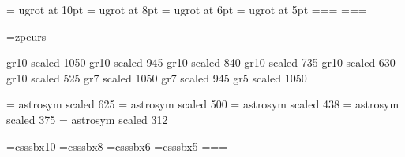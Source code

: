 \ifnum{}

  \font\tenve   = \fontdir ugrot at 10pt
  \font\eightve = \fontdir ugrot at 8pt
  \font\sixve   = \fontdir ugrot at 6pt
  \font\fiveve  = \fontdir ugrot at 5pt
  \textfont\vefam=\tenve \scriptfont\vefam=\eightve \scriptscriptfont\vefam=\sixve
  \textfont\vefam=\tenve \scriptfont\vefam=\eightve \scriptscriptfont\vefam=\sixve

  \font\eurofnt=\fontdir zpeurs

  \font\tengr    \fontdir gr10 scaled 1050
  \font\ninegr   \fontdir gr10 scaled 945
  \font\eightgr  \fontdir gr10 scaled 840
  \font\sevengr  \fontdir gr10 scaled 735
  \font\sixgr    \fontdir gr10 scaled 630
  \font\fivegr   \fontdir gr10 scaled 525
  \font\sevengr  \fontdir gr7  scaled 1050
  \font\sixgr    \fontdir gr7  scaled 945
  \font\fivegr   \fontdir gr5  scaled 1050

  \font\astrosymten   = \fontdir astrosym scaled 625
  \font\astrosymeight = \fontdir astrosym scaled 500
  \font\astrosymseven = \fontdir astrosym scaled 438
  \font\astrosymsix   = \fontdir astrosym scaled 375
  \font\astrosymfive  = \fontdir astrosym scaled 312

  \def\mesic{%
    {\mathchoice%
      {\hbox{\kern.02em\lower.1em \hbox{\astrosymten  \char210}}}%
      {\hbox{\kern.02em\lower.1em \hbox{\astrosymten  \char210}}}%
      {\hbox{\kern.01em\lower.1em \hbox{\astrosymeight\char210}}}%
      {\hbox{\kern.00em\lower.09em\hbox{\astrosymsix  \char210}}}%
    }%
  }

  \let\mathmu=\mu

\else
  \font\tenve=csssbx10
  \font\eightve=csssbx8
  \font\sixve=csssbx6
  \font\fiveve=csssbx5
  \textfont\vefam=\tenve \scriptfont\vefam=\eightve \scriptscriptfont\vefam=\sixve
  \let\vec=\oldvec

  \let\eurofont=\relax

  \let\tengr=\relax
  \let\ninegr=\relax
  \let\eightgr=\relax
  \let\sevengr=\relax
  \let\sixgr=\relax
  \let\fivegr=\relax

  \let\mesic=\relax
\fi

